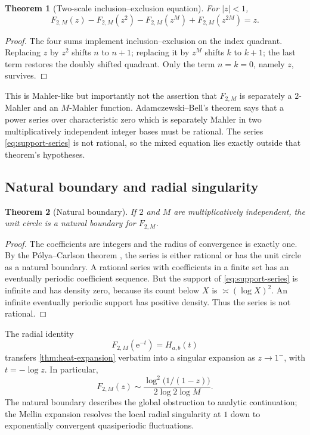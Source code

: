 \documentclass[11pt,oneside]{article}
\newtheorem{theorem}{Theorem}[section]
\theoremstyle{definition}
\theoremstyle{remark}
\newcommand{\e}{\mathrm e}
\begin{document}
\begin{theorem}[Two-scale inclusion--exclusion equation]
\label{thm:two-scale-mahler}
For $|z|<1$,
\begin{equation}
 F_{2,M}(z)-F_{2,M}(z^2)-F_{2,M}(z^M)+F_{2,M}(z^{2M})=z.
 \label{eq:two-scale-mahler}
\end{equation}
\end{theorem}

\begin{proof}
The four sums implement inclusion--exclusion on the index quadrant.  Replacing $z$ by $z^2$ shifts $n$ to $n+1$; replacing it by $z^M$ shifts $k$ to $k+1$; the last term restores the doubly shifted quadrant.  Only the term $n=k=0$, namely $z$, survives.
\end{proof}

This is Mahler-like but importantly not the assertion that $F_{2,M}$ is separately a $2$-Mahler and an $M$-Mahler function.  Adamczewski--Bell's theorem \cite{AdamczewskiBell2017} says that a power series over characteristic zero which is separately Mahler in two multiplicatively independent integer bases must be rational.  The series \eqref{eq:support-series} is not rational, so the mixed equation lies exactly outside that theorem's hypotheses.

\subsection{Natural boundary and radial singularity}

\begin{theorem}[Natural boundary]
\label{thm:natural-boundary}
If $2$ and $M$ are multiplicatively independent, the unit circle is a natural boundary for $F_{2,M}$.
\end{theorem}

\begin{proof}
The coefficients are integers and the radius of convergence is exactly one.  By the P\'olya--Carlson theorem \cite{PolyaCarlson}, the series is either rational or has the unit circle as a natural boundary.  A rational series with coefficients in a finite set has an eventually periodic coefficient sequence.  But the support of \eqref{eq:support-series} is infinite and has density zero, because its count below $X$ is $\asymp(\log X)^2$.  An infinite eventually periodic support has positive density.  Thus the series is not rational.
\end{proof}

The radial identity
\begin{equation}
 F_{2,M}(\e^{-t})=H_{a,b}(t)
 \label{eq:radial-heat}
\end{equation}
transfers \cref{thm:heat-expansion} verbatim into a singular expansion as $z\to1^-$, with $t=-\log z$.  In particular,
\[
 F_{2,M}(z)
 \sim\frac{\log^2\!\bigl(1/(1-z)\bigr)}{2\log2\log M}.
\]
The natural boundary describes the global obstruction to analytic continuation; the Mellin expansion resolves the local radial singularity at $1$ down to exponentially convergent quasiperiodic fluctuations.
\end{document}
